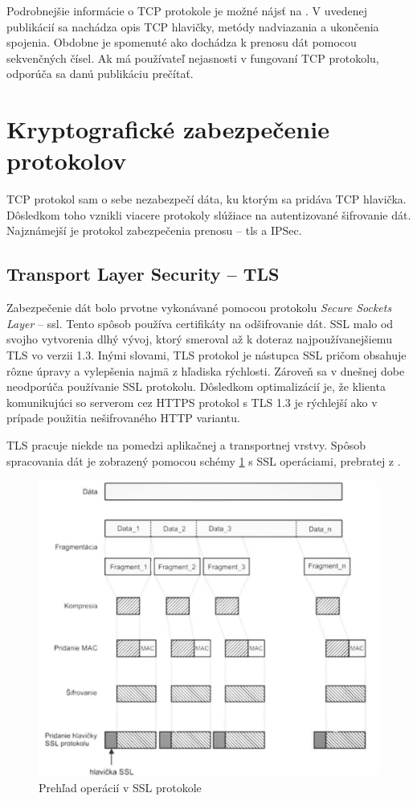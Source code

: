 Podrobnejšie informácie o TCP protokole je možné nájsť na \cite{tcp2}. V uvedenej publikácií sa nachádza opis TCP hlavičky, metódy nadviazania a ukončenia spojenia. Obdobne je spomenuté ako dochádza k prenosu dát pomocou sekvenčných čísel. Ak má používateľ nejasnosti v fungovaní TCP protokolu, odporúča sa danú publikáciu prečítať.

\section{Kryptografické zabezpečenie protokolov}
TCP protokol sam o sebe nezabezpečí dáta, ku ktorým sa pridáva TCP hlavička. Dôsledkom toho vznikli viacere protokoly slúžiace na autentizované šifrovanie dát. Najznámejší je protokol zabezpečenia prenosu -- \acrshort{tls} a IPSec.
\subsection{Transport Layer Security -- TLS}
Zabezpečenie dát bolo prvotne vykonávané pomocou protokolu \textit{Secure Sockets Layer} -- \acrshort{ssl}. Tento spôsob používa certifikáty na odšifrovanie dát. SSL malo od svojho vytvorenia dlhý vývoj, ktorý smeroval až k doteraz najpoužívanejšiemu TLS vo verzii 1.3. Inými slovami, TLS protokol je nástupca SSL pričom obsahuje rôzne úpravy a vylepšenia najmä z hľadiska rýchlosti. Zároveň sa v dnešnej dobe neodporúča používanie SSL protokolu. Dôsledkom optimalizácií je, že klienta komunikujúci so serverom cez HTTPS protokol s TLS 1.3 je rýchlejší ako v prípade použitia nešifrovaného HTTP variantu. 

TLS pracuje niekde na pomedzi aplikačnej a transportnej vrstvy. Spôsob spracovania dát je zobrazený pomocou schémy \ref{ssl} s SSL operáciami, prebratej z \cite{biks}. 
\begin{figure}[!ht]
	\centering
	\includegraphics[width=0.7\linewidth]{figures/ssl}
	\caption{Prehľad operácií v SSL protokole}
	\label{ssl}
\end{figure}

